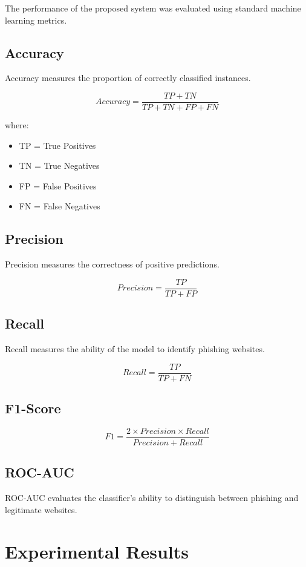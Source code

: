 \documentclass[12pt]{report}
\begin{document}
The performance of the proposed system was evaluated using standard machine learning metrics.

\subsection{Accuracy}

Accuracy measures the proportion of correctly classified instances.

\[
Accuracy = \frac{TP + TN}{TP + TN + FP + FN}
\]

where:

\begin{itemize}
    \item TP = True Positives
    \item TN = True Negatives
    \item FP = False Positives
    \item FN = False Negatives
\end{itemize}

\subsection{Precision}

Precision measures the correctness of positive predictions.

\[
Precision = \frac{TP}{TP + FP}
\]

\subsection{Recall}

Recall measures the ability of the model to identify phishing websites.

\[
Recall = \frac{TP}{TP + FN}
\]

\subsection{F1-Score}

\[
F1 = \frac{2 \times Precision \times Recall}
{Precision + Recall}
\]

\subsection{ROC-AUC}

ROC-AUC evaluates the classifier's ability to distinguish between phishing and legitimate websites.

\section{Experimental Results}
\end{document}
